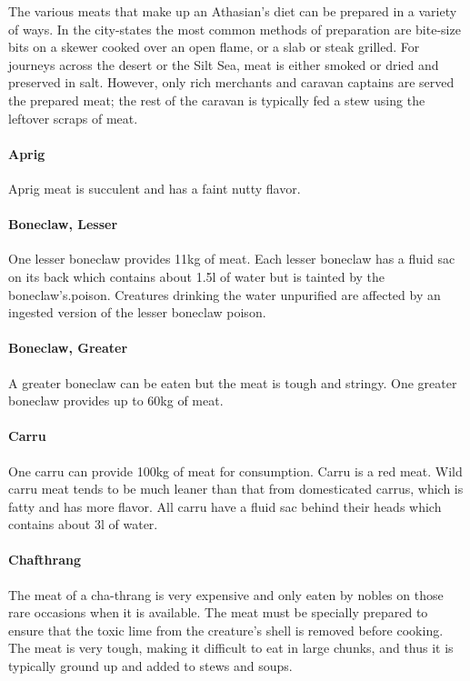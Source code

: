 \begin{multicols}{2}

The various meats that make up an Athasian's diet can be prepared in a variety of ways. In the city-states the most common methods of preparation are bite-size bits on a skewer cooked over an open flame, or a slab or steak grilled. For journeys across the desert or the Silt Sea, meat is either smoked or dried and preserved in salt. However, only rich merchants and caravan captains are served the prepared meat; the rest of the caravan is typically fed a stew using the leftover scraps of meat.

\paragraph{Aprig} Aprig meat is succulent and has a faint nutty flavor.\\
\paragraph{Boneclaw, Lesser} One lesser boneclaw provides 11kg of meat. Each lesser boneclaw has a fluid sac on its back which contains about 1.5l of water but is tainted by the boneclaw's.poison.  Creatures drinking the water unpurified are affected by an ingested version of the lesser boneclaw poison. \\
\paragraph{Boneclaw, Greater} A greater boneclaw can be eaten but the meat is tough and stringy. One greater boneclaw provides up to 60kg of meat.\\
\paragraph{Carru} One carru can provide 100kg of meat for consumption. Carru is a red meat. Wild carru meat tends to be much leaner than that from domesticated carrus, which is fatty and has more flavor. All carru have a fluid sac behind their heads which contains about 3l of water.\\
\paragraph{Chafthrang} The meat of a cha-thrang is very expensive and only eaten by nobles on those rare occasions when it is available. The meat must be specially prepared to ensure that the toxic lime from the creature's shell is removed before cooking. The meat is very tough, making it difficult to eat in large chunks, and thus it is typically ground up and added to stews and soups.\\

\end{multicols}
